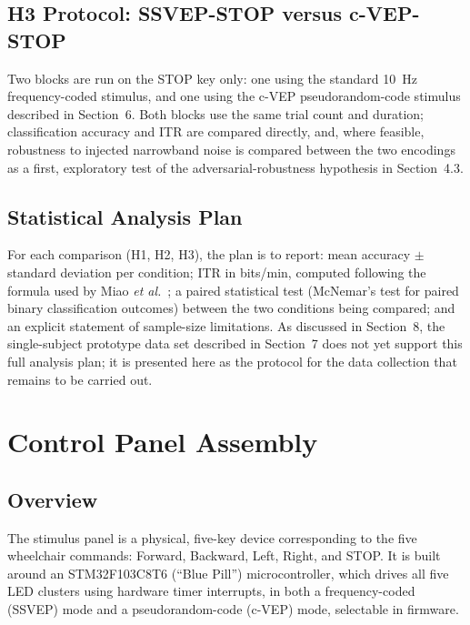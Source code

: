 \documentclass[11pt]{article}
\begin{document}
\subsection{H3 Protocol: SSVEP-STOP versus c-VEP-STOP}

Two blocks are run on the STOP key only: one using the standard 10~Hz frequency-coded stimulus, and one using the c-VEP pseudorandom-code stimulus described in Section~6. Both blocks use the same trial count and duration; classification accuracy and ITR are compared directly, and, where feasible, robustness to injected narrowband noise is compared between the two encodings as a first, exploratory test of the adversarial-robustness hypothesis in Section~4.3.

\subsection{Statistical Analysis Plan}

For each comparison (H1, H2, H3), the plan is to report: mean accuracy $\pm$ standard deviation per condition; ITR in bits/min, computed following the formula used by Miao \textit{et al.}~\cite{miao2024cvepminimal}; a paired statistical test (McNemar's test for paired binary classification outcomes) between the two conditions being compared; and an explicit statement of sample-size limitations. As discussed in Section~8, the single-subject prototype data set described in Section~7 does not yet support this full analysis plan; it is presented here as the protocol for the data collection that remains to be carried out.


\section{Control Panel Assembly}

\subsection{Overview}

The stimulus panel is a physical, five-key device corresponding to the five wheelchair commands: Forward, Backward, Left, Right, and STOP. It is built around an STM32F103C8T6 (``Blue Pill'') microcontroller, which drives all five LED clusters using hardware timer interrupts, in both a frequency-coded (SSVEP) mode and a pseudorandom-code (c-VEP) mode, selectable in firmware.
\end{document}
